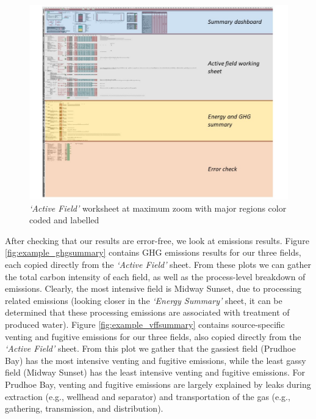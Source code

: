 \documentclass[11pt]{report}
\newcommand{\sheet}[1]{\textit{`{#1}'}}
\begin{document}
\begin{figure}[!htbp]
\includegraphics[width=1\columnwidth]{documentation/images/User_Guide_figs/activefield.jpg}
\caption{\sheet{Active Field} worksheet at maximum zoom with major regions color coded and labelled}
\label{fig:example_activefield}
\end{figure}

After checking that our results are error-free, we look at emissions results. Figure \ref{fig:example_ghgsummary} contains GHG emissions results for our three fields, each copied directly from the \sheet{Active Field} sheet. From these plots we can gather the total carbon intensity of each field, as well as the process-level breakdown of emissions. Clearly, the most intensive field is Midway Sunset, due to processing related emissions (looking closer in the \sheet{Energy Summary} sheet, it can be determined that these processing emissions are associated with treatment of produced water). Figure \ref{fig:example_vffsummary} contains source-specific venting and fugitive emissions for our three fields, also copied directly from the \sheet{Active Field} sheet. From this plot we gather that the gassiest field (Prudhoe Bay) has the most intensive venting and fugitive emissions, while the least gassy field (Midway Sunset) has the least intensive venting and fugitive emissions. For Prudhoe Bay, venting and fugitive emissions are largely explained by leaks during extraction (e.g., wellhead and separator) and transportation of the gas (e.g., gathering, transmission, and distribution).
\end{document}
